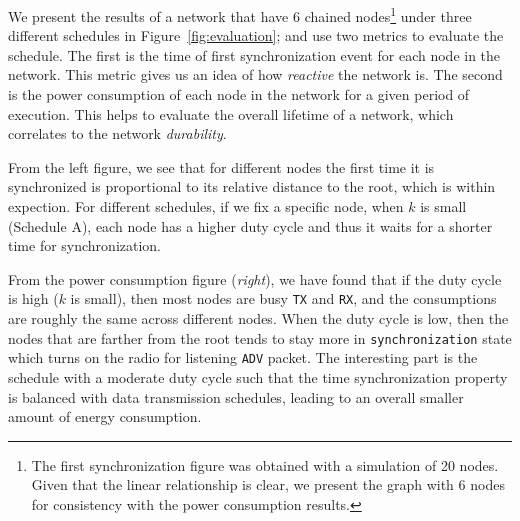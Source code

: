 We present the results of a network that have 6 chained nodes\footnote{The first synchronization figure was obtained with a simulation of 20 nodes. Given that the linear relationship is clear, we present the graph with 6 nodes for consistency with the power consumption results.} under three different schedules in Figure~\ref{fig:evaluation}; and use two metrics to evaluate the schedule. The first is the time of first synchronization event for each node in the network. This metric gives us an idea of how \emph{reactive} the network is. The second is the power consumption of each node in the network for a given period of execution. This helps to evaluate the overall lifetime of a network, which correlates to the network {\em durability}.

From the left figure, we see that for different nodes the first time it is synchronized is proportional to its relative distance to the root, which is within expection. For different schedules, if we fix a specific node, when $k$ is small (Schedule A), each node has a higher duty cycle and thus it waits for a shorter time for synchronization. 

From the power consumption figure ({\em right}), we have found that if the duty cycle is high ($k$ is small), then most nodes are busy \texttt{TX} and \texttt{RX}, and the consumptions are roughly the same across different nodes. When the duty cycle is low, then the nodes that are farther from the root tends to stay more in \texttt{synchronization} state which turns on the radio for listening \texttt{ADV} packet. The interesting part is the schedule with a moderate duty cycle such that the time synchronization property is balanced with data transmission schedules, leading to an overall smaller amount of energy consumption. 

